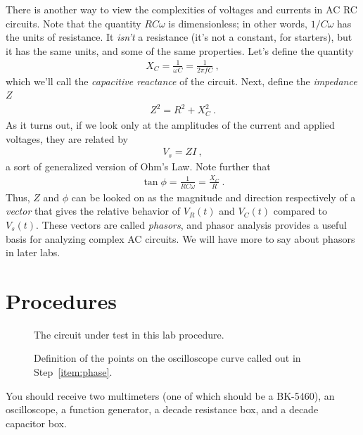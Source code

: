 \documentclass[12pt]{article}
\begin{document}
There is another way to view the complexities of voltages and currents
in AC RC circuits.  Note that the quantity $RC\omega$ is
dimensionless; in other words, $1/C\omega$ has the units of
resistance.  It \textit{isn't} a resistance (it's not a constant, for
starters), but it has the same units, and some of the same properties.
Let's define the quantity
\begin{gather*}
  X_C = \frac{1}{\omega C} = \frac{1}{2\pi f C}\ ,
\end{gather*}
which we'll call the \textit{capacitive reactance} of the circuit.
Next, define the \textit{impedance} $Z$
\begin{gather*}
  Z^2 = R^2 + X_C^2\ .
\end{gather*}
As it turns out, if we look only at the amplitudes of the current and
applied voltages, they are related by 
\begin{gather*}
  V_s = Z I\ ,
\end{gather*}
a sort of generalized version of Ohm's Law.  Note further that
\begin{gather*}
  \tan \phi = \frac{1}{RC\omega} = \frac{X_C}{R}\ .
\end{gather*}
Thus, $Z$ and $\phi$ can be looked on as the magnitude and direction
respectively of a \textit{vector} that gives the relative behavior of
$V_R(t)$ and $V_C(t)$ compared to $V_s(t)$.  These vectors are called
\textit{phasors}, and phasor analysis provides a useful basis for
analyzing complex AC circuits.  We will have more to say about phasors
in later labs.

\section{Procedures}
\label{sec:procedures}

\begin{figure}
  \centering
  
  \caption{The circuit under test in this lab procedure.}
  \label{fig:circuit}
\end{figure}
\begin{figure}
  \centering
  
  \caption{Definition of the points on the oscilloscope curve called
    out in Step~\ref{item:phase}.} 
  \label{fig:curvedefs}
\end{figure}
You should receive two multimeters (one of which should be a
BK-5460), an oscilloscope, a function generator, a
decade resistance box, and a decade capacitor box.
\end{document}
